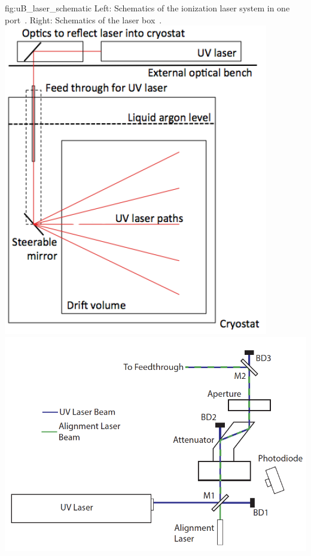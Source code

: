\begin{dunefigure}{fig:uB_laser_schematic}
{Left: Schematics of the ionization laser system in one port~\cite{Antonello:2015lea}. Right: Schematics of the laser box~\cite{microboone}.}
\includegraphics[width=0.45\linewidth]{graphics/uB_laser_schematic}
\includegraphics[width=0.5\linewidth]{graphics/uB_laser_box}
\end{dunefigure}

